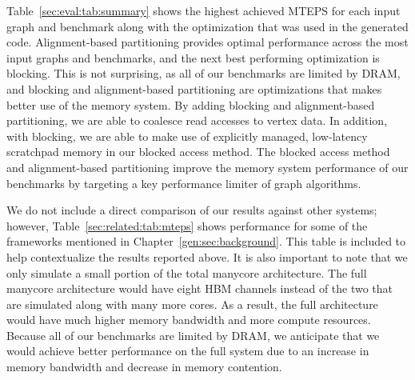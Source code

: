 Table~\ref{sec:eval:tab:summary} shows the highest achieved MTEPS for each input graph and benchmark along with the optimization that was used in the generated code.
Alignment-based partitioning provides optimal performance across the most input graphs and benchmarks, and the next best performing optimization is blocking.
This is not surprising, as all of our benchmarks are limited by DRAM, and blocking and alignment-based partitioning are optimizations that makes better use of the memory system.
By adding blocking and alignment-based partitioning, we are able to coalesce read accesses to vertex data.
In addition, with blocking, we are able to make use of explicitly managed, low-latency scratchpad memory in our blocked access method. 
The blocked access method and alignment-based partitioning improve the memory system performance of our benchmarks by targeting a key performance limiter of graph algorithms.

\relatedMTEPSTable

We do not include a direct comparison of our results against other systems; however, Table~\ref{sec:related:tab:mteps} shows performance for some of the frameworks mentioned in Chapter~\ref{gen:sec:background}. This table is included to help contextualize the results reported above.
It is also important to note that we only simulate a small portion of the total manycore architecture. 
The full manycore architecture would have eight HBM channels instead of the two that are simulated along with many more cores.
As a result, the full architecture would have much higher memory bandwidth and more compute resources. 
Because all of our benchmarks are limited by DRAM, we anticipate that we would achieve better performance on the full system due to an increase in memory bandwidth and decrease in memory contention.

\overviewResultsTable